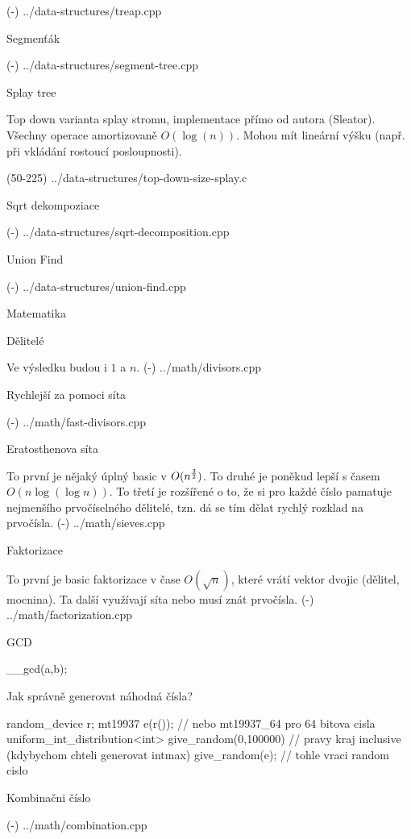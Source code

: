 \verbinput (-) ../data-structures/treap.cpp

\sec Segmenťák

\verbinput (-) ../data-structures/segment-tree.cpp

\sec Splay tree

Top down varianta splay stromu, implementace přímo od autora (Sleator).
Všechny operace amortizovaně $O(\log(n))$.
Mohou mít lineární výšku (např. při vkládání rostoucí posloupnosti).

\verbinput (50-225) ../data-structures/top-down-size-splay.c

\sec Sqrt dekompoziace

\verbinput (-) ../data-structures/sqrt-decomposition.cpp

\sec Union Find 

\verbinput (-) ../data-structures/union-find.cpp

\newpage

\chap Matematika

\sec Dělitelé 

Ve výsledku budou i $1$ a $n$.
\verbinput (-) ../math/divisors.cpp

\secc Rychlejší za pomoci síta 

\verbinput (-) ../math/fast-divisors.cpp

\sec Eratosthenova síta 

To první je nějaký úplný basic v $O(n^{3 \over 2})$. To druhé je poněkud lepší s časem $O(n\log(\log n))$. To třetí je rozšířené o to, že si pro každé číslo pamatuje nejmenšího prvočíselného dělitelé, tzn. dá se tím dělat rychlý rozklad na prvočísla.
\verbinput (-) ../math/sieves.cpp

\sec Faktorizace 

To první je basic faktorizace v čase $O(\sqrt n)$, které vrátí vektor dvojic (dělitel, mocnina). Ta další využívají síta nebo musí znát prvočísla.
\verbinput (-) ../math/factorization.cpp

\sec GCD 

\begtt
__gcd(a,b);
\endtt

\sec Jak správně generovat náhodná čísla? 

\begtt
  random_device r;
  mt19937 e(r()); // nebo mt19937_64 pro 64 bitova cisla
  uniform_int_distribution<int> give_random(0,100000) // pravy kraj inclusive (kdybychom chteli generovat intmax)
  give_random(e); // tohle vraci random cislo
\endtt

\sec Kombinačni číslo 

\verbinput (-) ../math/combination.cpp


